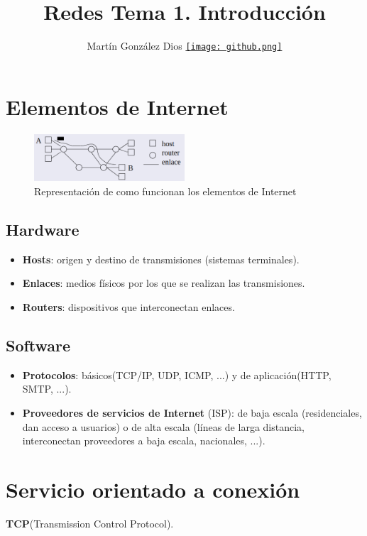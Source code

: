 \documentclass{article}
\title{Redes Tema 1. Introducción}
\author{Martín González Dios 
\href{https://github.com/martindios}{\texttt{[image: github.png]}}}
\begin{document}
\maketitle

\section{Elementos de Internet}

\begin{figure}[h]
    \centering
    \includegraphics[width=0.5\textwidth]{img-t1/img_298_51.png}
    \caption{Representación de como funcionan los elementos de Internet}
\end{figure}

\subsection{Hardware}
\begin{itemize}
    \item \textbf{Hosts}: origen y destino de transmisiones (sistemas terminales).
    \item \textbf{Enlaces}: medios físicos por los que se realizan las transmisiones.
    \item \textbf{Routers}: dispositivos que interconectan enlaces.
\end{itemize}

\subsection{Software}
\begin{itemize}
    \item \textbf{Protocolos}: básicos(TCP/IP, UDP, ICMP, ...) y de aplicación(HTTP, SMTP, ...).
    \item \textbf{Proveedores de servicios de Internet} (ISP): de baja escala (residenciales, dan acceso a usuarios) o de alta escala (líneas de larga distancia, interconectan proveedores a baja escala, nacionales, ...).
\end{itemize}

\section{Servicio orientado a conexión}
\textbf{TCP}(Transmission Control Protocol).
\end{document}
